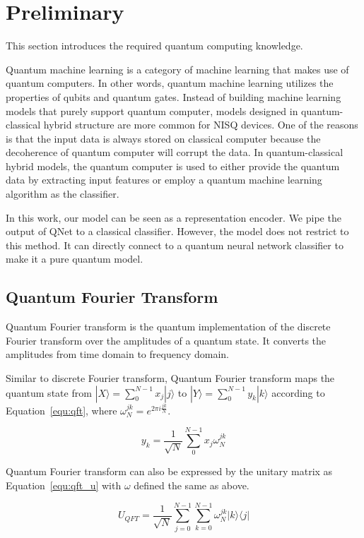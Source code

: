 \section{Preliminary}

This section introduces the required quantum computing knowledge.

Quantum machine learning is a category of machine learning that makes use of quantum computers. In other words, quantum machine learning utilizes the properties of qubits and quantum gates. Instead of building machine learning models that purely support quantum computer, models designed in quantum-classical hybrid structure are more common for NISQ devices. One of the reasons is that the input data is always stored on classical computer because the decoherence of quantum computer will corrupt the data. In quantum-classical hybrid models, the quantum computer is used to either provide the quantum data by extracting input features or employ a quantum machine learning algorithm as the classifier.

In this work, our model can be seen as a representation encoder. We pipe the output of QNet to a classical classifier. However, the model does not restrict to this method. It can directly connect to a quantum neural network classifier to make it a pure quantum model.

\subsection{Quantum Fourier Transform}
Quantum Fourier transform is the quantum implementation of the discrete Fourier transform over the amplitudes of a quantum state. It converts the amplitudes from time domain to frequency domain.

Similar to discrete Fourier transform, Quantum Fourier transform maps the quantum state from $|X\rangle = \sum_0^{N-1} x_j|j\rangle$ to $|Y\rangle = \sum_0^{N-1} y_k |k\rangle$ according to Equation~\ref{equ:qft}, where $\omega^{jk}_N = e^{2\pi i \frac{jk}{N}}$.

\begin{equation} \label{equ:qft}
y_k = \frac{1}{\sqrt{N}} \sum_0^{N-1} x_j \omega_N^{jk}
\end{equation}

Quantum Fourier transform can also be expressed by the unitary matrix as Equation~\ref{equ:qft_u} with $\omega$ defined the same as above.

\begin{equation} \label{equ:qft_u}
U_{QFT} = \frac{1}{\sqrt{N}} \sum_{j=0}^{N-1}  \sum_{k=0}^{N-1} \omega_{N}^{jk} |k\rangle \langle j|
\end{equation}


